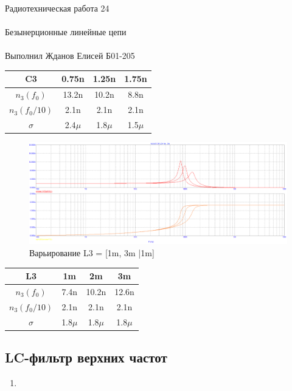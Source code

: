 \documentclass{astroedu-lab}
\begin{document}
\begin{problem}{\huge Радиотехническая работа 24\\\\Безынерционные линейные цепи\\\\Выполнил Жданов Елисей Б01-205}
\begin{enumerate}
\begin{center}
\begin{tabular}{|c|c|c|c|}
\hline
    C3 & 0.75n & 1.25n & 1.75n\\ \hline
    $n_3(f_0)$ & 13.2n & 10.2n & 8.8n\\ \hline
    $n_3(f_0/10)$ & 2.1n & 2.1n & 2.1n \\ \hline
    $\sigma$ & 2.4$\mu$ & 1.8$\mu$ & 1.5$\mu$ \\ \hline
\end{tabular}
\end{center}

\begin{figure}[h!]
    \centering
    \includegraphics[scale=0.3]{images/mod3_3_2_3.png}
    \caption{Варьирование L3 = [1m, 3m |1m]}
    \label{fig:m3323}
\end{figure}

\begin{center}
\begin{tabular}{|c|c|c|c|}
\hline
    L3 & 1m & 2m & 3m\\ \hline
    $n_3(f_0)$ & 7.4n & 10.2n & 12.6n\\ \hline
    $n_3(f_0/10)$ & 2.1n & 2.1n & 2.1n \\ \hline
    $\sigma$ & 1.8$\mu$ & 1.8$\mu$ & 1.8$\mu$ \\ \hline
\end{tabular}
\end{center}

\end{enumerate}

\subsection*{LC-фильтр верхних частот}

\newpage

\begin{enumerate}

\item


\end{enumerate}
\end{problem}
\end{document}
